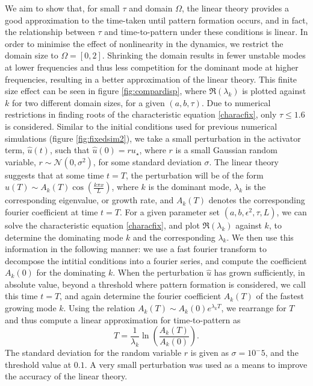 \documentclass[12pt]{report}
\begin{document}
We aim to show that, for small $\tau$ and domain $\Omega$, the linear theory provides a good approximation to the time-taken until pattern formation occurs, and in fact, the relationship between $\tau$ and time-to-pattern under these conditions is linear.
In order to minimise the effect of nonlinearity in the dynamics, we restrict the domain size to $\Omega=[0,2]$. Shrinking the domain results in fewer unstable modes at lower frequencies and thus less competition for the dominant mode at higher frequencies, resulting in a better approximation of the linear theory. This finite size effect can be seen in figure \ref{fig:compardisp}, where $\Re(\lambda_k)$ is plotted against $k$ for two different domain sizes, for a given $(a,b,\tau)$. Due to numerical restrictions in finding roots of the characteristic equation \eqref{characfix}, only $\tau\leq1.6$ is considered. Similar to the initial conditions used for previous numerical simulations (figure \ref{fig:fixedsim2}), we take a small perturbation in the activator term, $\hat{u}(t)$, such that $\hat{u}(0)=ru_\star$, where $r$ is a small Gaussian random variable, $r\sim\mathcal{N}(0,\sigma^2)$,
for some standard deviation $\sigma$. The linear theory suggests that at some time $t=T$, the perturbation will be of the form $\hat{u}(T)\sim A_k(T)\cos\left(\frac{k\pi x}{L}\right)$, where $k$ is the dominant mode, $\lambda_k$ is the corresponding eigenvalue, or growth rate, and $A_k(T)$ denotes the corresponding fourier coefficient at time $t=T$. For a given parameter set $(a,b,\epsilon^2,\tau,L)$, we can solve the characteristic equation \eqref{characfix}, and plot $\Re(\lambda_k)$
against $k$, to determine the dominating mode $k$ and the corresponding $\lambda_k$. We then use this information in the following manner: we use a fast fourier transform to decompose the intitial conditions into a fourier series, and compute the coefficient $A_k(0)$ for the dominating $k$. When the perturbation $\hat{u}$ has grown sufficiently, in absolute value, beyond a threshold where pattern formation is considered, we call this time $t=T$, and again determine the fourier coefficient $A_k(T)$ of the fastest growing mode $k$. Using the relation $A_k(T)\sim A_k(0)e^{\lambda_k T}$, we rearrange for $T$ and thus compute a linear approximation for time-to-pattern as
\begin{equation}
    T=\frac{1}{\lambda_k}\ln\left(\frac{A_k(T)}{A_k(0)}\right).
\end{equation}
The standard deviation for the random variable $r$ is given as $\sigma=10^-5$, and the threshold value at $0.1$. A very small perturbation was used as a means to improve the accuracy of the linear theory.
\end{document}
